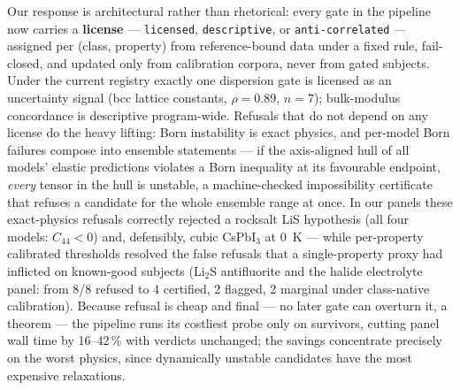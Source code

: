 \documentclass[11pt]{article}
\theoremstyle{definition}
\theoremstyle{remark}
\newcommand{\code}[1]{\texttt{#1}}
\begin{document}
Our response is architectural rather than rhetorical: every gate in the pipeline now carries a \textbf{license} --- \code{licensed}, \code{descriptive}, or \code{anti-correlated} --- assigned per (class, property) from reference-bound data under a fixed rule, fail-closed, and updated only from calibration corpora, never from gated subjects. Under the current registry exactly one dispersion gate is licensed as an uncertainty signal (bcc lattice constants, $\rho = 0.89$, $n = 7$); bulk-modulus concordance is descriptive program-wide. Refusals that do not depend on any license do the heavy lifting: Born instability is exact physics, and per-model Born failures compose into ensemble statements --- if the axis-aligned hull of all models' elastic predictions violates a Born inequality at its favourable endpoint, \emph{every} tensor in the hull is unstable, a machine-checked impossibility certificate that refuses a candidate for the whole ensemble range at once. In our panels these exact-physics refusals correctly rejected a rocksalt LiS hypothesis (all four models: $C_{44} < 0$) and, defensibly, cubic CsPbI$_3$ at 0~K --- while per-property calibrated thresholds resolved the false refusals that a single-property proxy had inflicted on known-good subjects (Li$_2$S antifluorite and the halide electrolyte panel: from 8/8 refused to 4 certified, 2 flagged, 2 marginal under class-native calibration). Because refusal is cheap and final --- no later gate can overturn it, a theorem --- the pipeline runs its costliest probe only on survivors, cutting panel wall time by 16--42\,\% with verdicts unchanged; the savings concentrate precisely on the worst physics, since dynamically unstable candidates have the most expensive relaxations.
\end{document}
